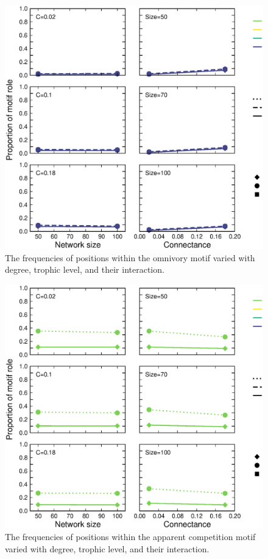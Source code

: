 \documentclass[12pt]{article}
\begin{document}
\begin{spacing}{2.0}
    
            \begin{figure}[h!]
                \centering
                \includegraphics[width=.75\textwidth]{figures/positions_bySC_Omnivory.eps}
                \caption{The frequencies of positions within the omnivory motif varied with degree, trophic level, and their interaction.}
                \label{omnivory_SC}
            \end{figure}
    
    
            \begin{figure}[h!]
                \centering
                \includegraphics[width=.75\textwidth]{figures/positions_bySC_Apparentcompetition.eps}
                \caption{The frequencies of positions within the apparent competition motif varied with degree, trophic level, and their interaction.}
                \label{appcomp_SC}
            \end{figure}
    

\end{spacing}
\end{document}
